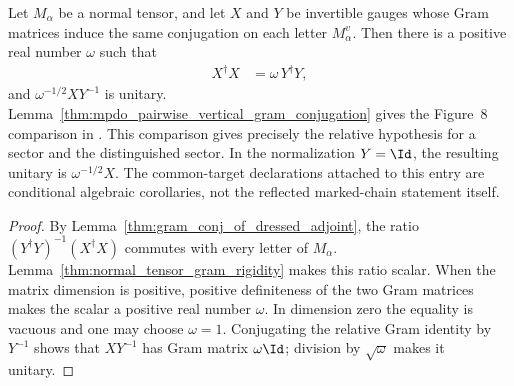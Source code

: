 \begin{lemma}
    \label{thm:eq3_of_dressed_adjoint}
    \leanok
    Let $M_\alpha$ be a normal tensor, and let $X$ and $Y$ be invertible
    gauges whose Gram matrices induce the same conjugation on each letter
    $M_\alpha^v$. Then there is a positive real number $\omega$ such that
    \begin{align}
        X^\dagger X
         & =\omega\,Y^\dagger Y,
        \label{eq:mpdo_gram_proportionality}
    \end{align}
    and $\omega^{-1/2}XY^{-1}$ is unitary.
    Lemma~\ref{thm:mpdo_pairwise_vertical_gram_conjugation} gives the
    Figure~8 comparison in
    \cite[Proposition~4.13, lines 1909--1921]{Cirac2016MPDO_arXiv}. This
    comparison gives precisely the relative hypothesis for a sector and
    the distinguished sector. In the normalization $Y=\Id$, the resulting
    unitary is $\omega^{-1/2}X$. The common-target declarations attached to
    this entry are conditional algebraic corollaries, not the reflected
    marked-chain statement itself.
\end{lemma}

\begin{proof}
    \leanok
    By Lemma~\ref{thm:gram_conj_of_dressed_adjoint}, the ratio
    $(Y^\dagger Y)^{-1}(X^\dagger X)$ commutes with every letter of
    $M_\alpha$. Lemma~\ref{thm:normal_tensor_gram_rigidity} makes this
    ratio scalar. When the matrix dimension is positive, positive
    definiteness of the two Gram matrices makes the scalar a positive real
    number $\omega$. In dimension zero the equality is vacuous and one may
    choose $\omega=1$. Conjugating the relative Gram identity by $Y^{-1}$
    shows that $XY^{-1}$ has Gram matrix $\omega\Id$; division by
    $\sqrt{\omega}$ makes it unitary.
\end{proof}

